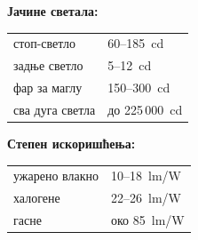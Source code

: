 \documentclass{report}
\begin{document}
\begin{kljucno}
\begin{minipage}[t]{0.5\linewidth}
\textbf{Јачине светала:}\\[2pt]
\begin{tabular}{@{}ll}
    стоп-светло        & 60--185~cd \\
    задње светло       & 5--12~cd \\
    фар за маглу       & 150--300~cd \\
    сва дуга светла    & до 225\,000~cd \\
\end{tabular}
\end{minipage}\hfill
\begin{minipage}[t]{0.45\linewidth}
\textbf{Степен искоришћења:}\\[2pt]
\begin{tabular}{@{}ll}
    ужарено влакно  & 10--18~lm/W \\
    халогене        & 22--26~lm/W \\
    гасне           & око 85~lm/W \\
\end{tabular}
\end{minipage}
\end{kljucno}
\end{document}
